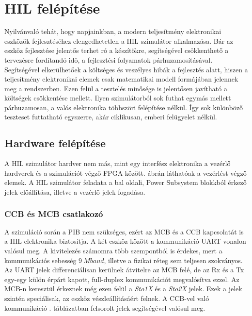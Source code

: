 \chapter{HIL felépítése}

Nyilvánvaló tehát, hogy napjainkban, a modern teljesítmény elektronikai eszközök fejlesztéséhez elengedhetetlen a HIL szimulátor alkalmazása. Bár az eszköz fejlesztése jelentős terhet ró a készítőkre, segítségével csökkenthető a tervezésre fordítandó idő, a fejlesztési folyamatok párhuzamosításával. Segítségével elkerülhetőek a költséges és veszélyes hibák a fejlesztés alatt, hiszen a teljesítmény elektronikai elemek csak matematikai modell formájában jelennek meg a rendszerben. Ezen felül a tesztelés minősége is jelentősen javítható a költségek csökkentése mellett. Ilyen szimulátorból sok futhat egymás mellett párhuzamosan, a valós elektronika többszöri felépítése nélkül. Így sok különböző teszteset futtatható egyszerre, akár ciklikusan, emberi felügyelet nélkül. \cite{sutozoli}\cite{low_cost_rt_hil}\cite{hw_emu}

\section{Hardware felépítése}

A HIL szimulátor hardver nem más, mint egy interfész elektronika a vezérlő hardverek és a szimulációt végző FPGA között.  ábrán láthatóak a vezérlést végző elemek. A HIL szimulátor feladata a bal oldali, Power Subsystem blokkból érkező jelek előállítása, illetve a vezérlő jelek fogadása.

\subsection{CCB és MCB csatlakozó}
A szimuláció során a PIB nem szükséges, ezért az MCB és a CCB kapcsolatát is a HIL elektronika biztosítja. A két eszköz között a kommunikáció UART vonalon valósul meg. A kivitelezés számomra több szempontból is érdekes, mert a kommunikációs sebesség $9\ Mbaud$, illetve a fizikai réteg sem teljesen szokványos. Az UART jelek differenciálisan kerülnek átvitelre az MCB felé, de az Rx és a Tx egy-egy külön érpárt kapott, full-duplex kommunikációt megvalósítva ezzel. Az MCB-n keresztül érkeznek még ezen felül a \emph{Sto1X} és a \emph{Sto2X} jelek. Ezek a jelek szintén speciálisak, az eszköz vészleállításáért felnek. A CCB-vel való kommunikáció . táblázatban felsorolt jelek segítségével valósul meg. 

